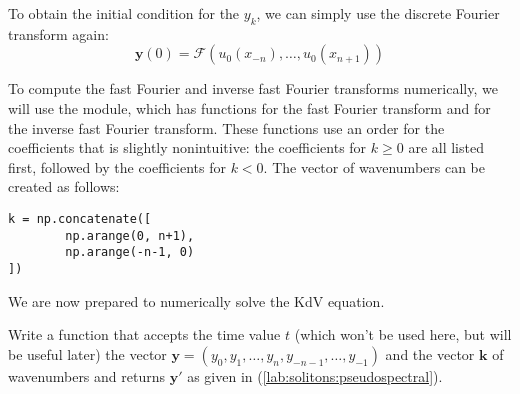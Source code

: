 To obtain the initial condition for the \(y_k\), we can simply use the discrete Fourier transform again:
\[
\mathbf{y}(0) = \mathcal{F}(u_0(x_{-n}),\ldots,u_0(x_{n+1}))
\]

To compute the fast Fourier and inverse fast Fourier transforms numerically, we will use the  module, which has functions  for the fast Fourier transform and  for the inverse fast Fourier transform.
These functions use an order for the coefficients that is slightly nonintuitive: the coefficients for \(k\geq 0\) are all listed first, followed by the coefficients for \(k<0\).
The vector of wavenumbers can be created as follows:
\begin{lstlisting}
k = np.concatenate([
        np.arange(0, n+1),
        np.arange(-n-1, 0)
])
\end{lstlisting}
We are now prepared to numerically solve the KdV equation.

\begin{problem}
Write a function that accepts the time value \(t\) (which won't be used here, but will be useful later) the vector \(\mathbf{y}=(y_0,y_1,\ldots,y_n,y_{-n-1},\ldots,y_{-1})\) and the vector \(\mathbf{k}\) of wavenumbers and returns \(\mathbf{y}'\) as given in (\ref{lab:solitons:pseudospectral}).
\end{problem}

